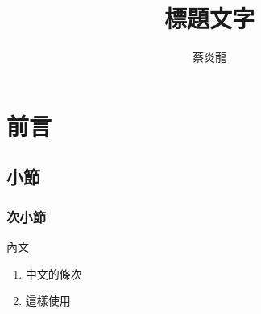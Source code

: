 \documentclass[12pt]{article}
\title{標題文字}
\author{蔡炎龍}
\date{}
\begin{document}
\maketitle


\tableofcontents
\clearpage
\section{前言}

\subsection{小節}

\subsubsection{次小節}

內文

\begin{enumerate}
\item 中文的條次
\item 這樣使用
\end{enumerate}
\end{document}
